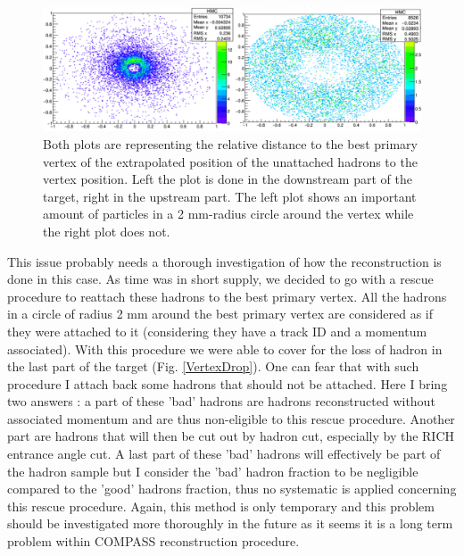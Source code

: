 \begin{figure}[!h]
	\includegraphics[scale=0.45]{./gfx/CircleHadron.png}
	\caption{Both plots are representing the relative distance to the best primary vertex of the extrapolated position of the unattached hadrons to the vertex position. Left the plot is done in the downstream part of the target, right in the upstream part. The left plot shows an important amount of particles in a 2 mm-radius circle around the vertex while the right plot does not.}
	\label{CircleHadron}
\end{figure}

This issue probably needs a thorough investigation of how the reconstruction is done in this case. As time was in short supply, we decided to go with a rescue procedure to reattach these hadrons to the best primary vertex. All the hadrons in a circle of radius 2 mm around the best primary vertex are considered as if they were attached to it (considering they have a track ID and a momentum associated). With this procedure we were able to cover for the loss of hadron in the last part of the target (Fig. \ref{VertexDrop}). One can fear that with such procedure I attach back some hadrons that should not be attached. Here I bring two answers : a part of these 'bad' hadrons are hadrons reconstructed without associated momentum and are thus non-eligible to this rescue procedure. Another part are hadrons that will then be cut out by hadron cut, especially by the RICH entrance angle cut. A last part of these 'bad' hadrons will effectively be part of the hadron sample but I consider the 'bad' hadron fraction to be negligible compared to the 'good' hadrons fraction, thus no systematic is applied concerning this rescue procedure. Again, this method is only temporary and this problem should be investigated more thoroughly in the future as it seems it is a long term problem within COMPASS reconstruction procedure.


